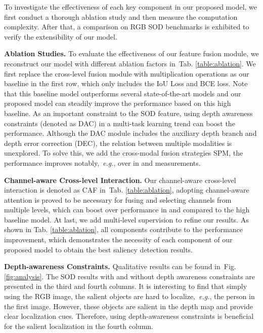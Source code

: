 \documentclass[journal]{IEEEtran}
\def\eg{{\em e.g.}}
\newcommand{\figref}[1]{Fig. \ref{#1}}
\newcommand{\tabref}[1]{Tab. \ref{#1}}
\begin{document}
To investigate the effectiveness of each key component in our proposed model, we first conduct a thorough ablation study and then measure the computation complexity. After that, a comparison on RGB SOD benchmarks is exhibited to verify the extensibility of our model.

\textbf{Ablation Studies.} To evaluate the effectiveness of our feature fusion module, we reconstruct our model with different ablation factors in~\tabref{table:ablation}. We first replace the cross-level fusion module with multiplication operations as our baseline in the first row, which only includes the IoU Loss and BCE loss. Note that this baseline model outperforms several state-of-the-art models and our proposed model can steadily improve the performance based on this high baseline.
As an important constraint to the SOD feature, using depth awareness constraints (denoted as DAC) in a multi-task learning trend can boost the performance. Although the DAC module includes the auxiliary depth branch and depth error correction (DEC), the relation between multiple modalities is unexplored.
To solve this, we add the cross-modal fusion strategies SPM, the performance improves notably,~\eg, over  in  and  measurements.

\textbf{Channel-aware Cross-level Interaction.} Our channel-aware cross-level interaction is denoted as CAF in~\tabref{table:ablation}, adopting channel-aware attention is proved to be necessary for fusing and selecting channels from multiple levels, which can boost over  performance in  and  compared to the high baseline model.
At last, we add multi-level supervision to refine our results. As shown in \tabref{table:ablation}, all components contribute to the performance improvement, which demonstrates the necessity of each component of our proposed model to obtain the best saliency detection results.

\textbf{Depth-awareness Constraints.} Qualitative results can be found in~\figref{fig:analysis}. The SOD results with and without depth awareness constraints are presented in the third and fourth columns. It is interesting to find that simply using the RGB image, the salient objects are hard to localize,~\eg, the person in the first image. However, these objects are salient in the depth map and provide clear localization cues. Therefore, using depth-awareness constraints is beneficial for the salient localization in the fourth column.
\end{document}
